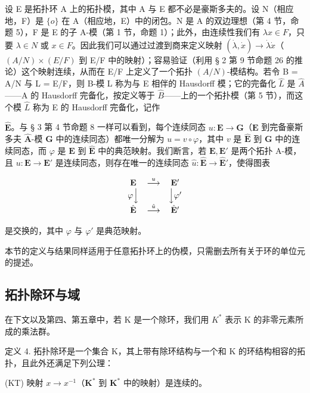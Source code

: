 设 E 是拓扑环 A 上的拓扑模，其中 A 与 E 都不必是豪斯多夫的。设 N（相应地，F）是 \(\{o\}\) 在 A（相应地，E）中的闭包。N 是 A 的双边理想（第 4 节，命题 5），F 是 E 的子 A-模（第 1 节，命题 1）；此外，由连续性我们有 \(\lambda x \in F\)，只要 \(\lambda \in N\) 或 \(x \in F\)。因此我们可以通过过渡到商来定义映射 \((\dot{\lambda}, \dot{x}) \to \dot{\lambda} \dot{x}\)（\((A/N) \times (E/F)\) 到 E/F 中的映射）；容易验证（利用 § 2 第 9 节命题 26 的推论）这个映射连续，从而在 E/F 上定义了一个拓扑 \((A/N)\)-模结构。若令 B = A/N 与 L = E/F，则 B-模 L 称为与 E 相伴的 Hausdorff 模；它的完备化 \(\hat{L}\) 是 \(\hat{A}\)——A 的 Hausdorff 完备化，按定义等于 \(\hat{B}\)——上的一个拓扑模（第 5 节），而这个模 \(\hat{L}\) 称为 E 的 Hausdorff 完备化，记作

\(\hat{\mathbf{E}}\)。与 § 3 第 4 节命题 8 一样可以看到，每个连续同态 \(u: \mathbf{E} \to \mathbf{G}\)（\(\mathbf{E}\) 到完备豪斯多夫 \(\hat{\mathbf{A}}\)-模 \(\mathbf{G}\) 中的连续同态）都唯一分解为 \(u = v \circ \varphi\)，其中 \(v\) 是 \(\hat{\mathbf{E}}\) 到 \(\mathbf{G}\) 中的连续同态，而 \(\varphi\) 是 \(\mathbf{E}\) 到 \(\hat{\mathbf{E}}\) 中的典范映射。我们断言，若 \(\mathbf{E}, \mathbf{E}'\) 是两个拓扑 A-模，且 \(u: \mathbf{E} \to \mathbf{E}'\) 是连续同态，则存在唯一的连续同态 \(\hat{u}: \hat{\mathbf{E}} \to \hat{\mathbf{E}}'\)，使得图表

\[
\begin{array}{c c c} \mathbf {E} & \stackrel {{u}} {{\longrightarrow}} & \mathbf {E} ^ {\prime} \\ \varphi \Big \downarrow & & \Big \downarrow \varphi^ {\prime} \\ \hat {\mathbf {E}} & \stackrel {{\hat {u}}} {{\longrightarrow}} & \hat {\mathbf {E}} ^ {\prime} \end{array}
\]

是交换的，其中 \(\varphi\) 与 \(\varphi'\) 是典范映射。

本节的定义与结果同样适用于任意拓扑环上的伪模，只需删去所有关于环的单位元的提述。

\subsection{拓扑除环与域}

在下文以及第四、第五章中，若 K 是一个除环，我们用 \(K^{*}\) 表示 K 的非零元素所成的乘法群。

定义 4. 拓扑除环是一个集合 K，其上带有除环结构与一个和 K 的环结构相容的拓扑，且此外还满足下列公理：

(KT) 映射 \(x \to x^{-1}\)（\(\mathbf{K}^*\) 到 \(\mathbf{K}^*\) 中的映射）是连续的。

